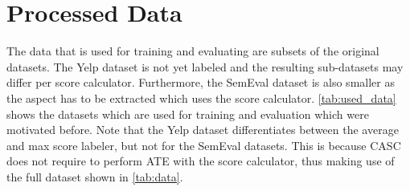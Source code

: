 \documentclass[american, oneside]{ecsgdp}
\begin{document}
\section{Processed Data} \label{sec:used_data}
The data that is used for training and evaluating are subsets of the original datasets. The Yelp dataset is not yet labeled and the resulting sub-datasets may differ per score calculator. Furthermore, the SemEval dataset is also smaller as the aspect has to be extracted which uses the score calculator. \cref{tab:used_data} shows the datasets which are used for training and evaluation which were motivated before. Note that the Yelp dataset differentiates between the average and max score labeler, but not for the SemEval datasets. This is because CASC does not require to perform ATE with the score calculator, thus making use of the full dataset shown in \cref{tab:data}.

\begin{table}[htbp]
\centering
\caption{Descriptive statistics of the Yelp, SemEval 2015 and SemEval 2016 sub-datasets.}
\label{tab:used_data}
\end{table}
\end{document}
